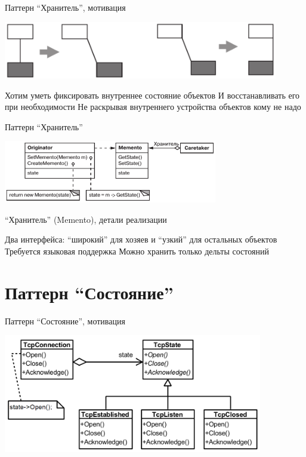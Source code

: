 \documentclass{../../slides-style}
\begin{document}
    \begin{frame}{Паттерн \enquote{Хранитель}, мотивация}
        \begin{center}
            \includegraphics[width=0.9\textwidth]{mementoMotivation.png}
        \end{center}
        \begin{outline}
            \1 Хотим уметь фиксировать внутреннее состояние объектов
            \1 И восстанавливать его при необходимости
            \1 Не раскрывая внутреннего устройства объектов кому не надо
        \end{outline}
    \end{frame}

    \begin{frame}{Паттерн \enquote{Хранитель}}
        \begin{center}
            \includegraphics[width=0.7\textwidth]{memento.png}
        \end{center}
    \end{frame}

    \begin{frame}{\enquote{Хранитель} (Memento), детали реализации}
        \begin{outline}
            \1 Два интерфейса: \enquote{широкий} для хозяев и \enquote{узкий} для остальных объектов
                \2 Требуется языковая поддержка
            \1 Можно хранить только дельты состояний
        \end{outline}
    \end{frame}

    \section{Паттерн \enquote{Состояние}}

    \begin{frame}{Паттерн \enquote{Состояние}, мотивация}
        \begin{center}
            \includegraphics[width=0.85\textwidth]{stateExample.png}
        \end{center}
    \end{frame}
\end{document}
